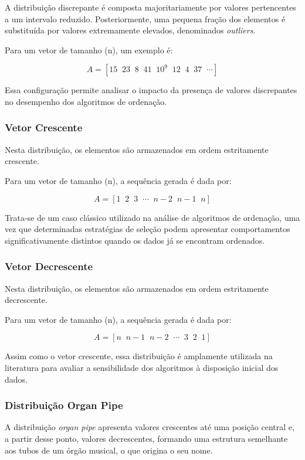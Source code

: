 \documentclass{article}
\begin{document}
A distribuição discrepante é composta majoritariamente por valores pertencentes a um intervalo reduzido. Posteriormente, uma pequena fração dos elementos é substituída por valores extremamente elevados, denominados \textit{outliers}.

Para um vetor de tamanho (n), um exemplo é:

\[
A =
[15 \;\; 23 \;\; 8 \;\; 41 \;\; 10^9 \;\; 12 \;\; 4 \;\; 37 \;\; \cdots]
\]

Essa configuração permite analisar o impacto da presença de valores discrepantes no desempenho dos algoritmos de ordenação.

\subsubsection{Vetor Crescente}

Nesta distribuição, os elementos são armazenados em ordem estritamente crescente.

Para um vetor de tamanho (n), a sequência gerada é dada por:

\[
A =
[1 \;\; 2 \;\; 3 \;\; \cdots \;\; n-2 \;\; n-1 \;\; n]
\]

Trata-se de um caso clássico utilizado na análise de algoritmos de ordenação, uma vez que determinadas estratégias de seleção podem apresentar comportamentos significativamente distintos quando os dados já se encontram ordenados.

\subsubsection{Vetor Decrescente}

Nesta distribuição, os elementos são armazenados em ordem estritamente decrescente.

Para um vetor de tamanho (n), a sequência gerada é dada por:

\[
A =
[n \;\; n-1 \;\; n-2 \;\; \cdots \;\; 3 \;\; 2 \;\; 1]
\]

Assim como o vetor crescente, essa distribuição é amplamente utilizada na literatura para avaliar a sensibilidade dos algoritmos à disposição inicial dos dados.

\subsubsection{Distribuição Organ Pipe}

A distribuição \textit{organ pipe} apresenta valores crescentes até uma posição central e, a partir desse ponto, valores decrescentes, formando uma estrutura semelhante aos tubos de um órgão musical, o que origina o seu nome.
\end{document}
